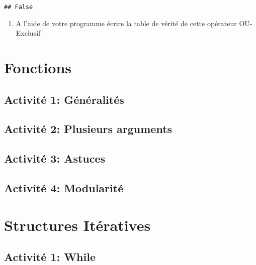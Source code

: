 \documentclass[
]{book}
\providecommand{\tightlist}{%
  \setlength{\itemsep}{0pt}\setlength{\parskip}{0pt}}
\def\tightlist{}
\begin{document}
\begin{verbatim}
## False
\end{verbatim}

\begin{enumerate}
\def\labelenumi{\arabic{enumi}.}
\setcounter{enumi}{4}
\tightlist
\item
  A l'aide de votre programme écrire la table de vérité de cette opérateur OU-Exclusif
\end{enumerate}

\hypertarget{fonctions}{%
\chapter{Fonctions}\label{fonctions}}

\hypertarget{activituxe9-1-guxe9nuxe9ralituxe9s}{%
\section{Activité 1: Généralités}\label{activituxe9-1-guxe9nuxe9ralituxe9s}}

\hypertarget{activituxe9-2-plusieurs-arguments}{%
\section{Activité 2: Plusieurs arguments}\label{activituxe9-2-plusieurs-arguments}}

\hypertarget{activituxe9-3-astuces}{%
\section{Activité 3: Astuces}\label{activituxe9-3-astuces}}

\hypertarget{activituxe9-4-modularituxe9}{%
\section{Activité 4: Modularité}\label{activituxe9-4-modularituxe9}}

\hypertarget{structures-ituxe9ratives}{%
\chapter{Structures Itératives}\label{structures-ituxe9ratives}}

\hypertarget{activituxe9-1-while}{%
\section{Activité 1: While}\label{activituxe9-1-while}}
\end{document}
